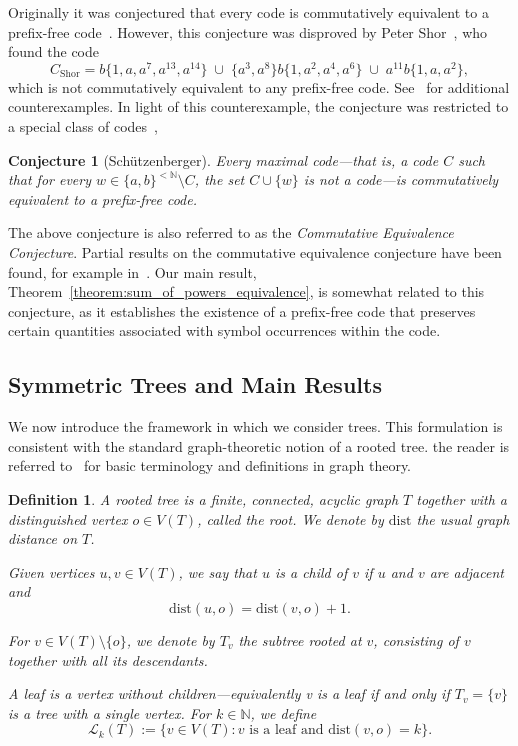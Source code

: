 \documentclass[a4,12pt]{article}%
\newtheorem{conjecture}[theorem]{Conjecture}
\newtheorem{definition}[theorem]{Definition}
\begin{document}
\medskip

Originally it was conjectured that every code is commutatively equivalent to a prefix-free code~\cite{CECoriginalConjecture}. However, this conjecture was disproved by Peter Shor~\cite{ShorCounterexample}, who found the code
\[
C_{\mathrm{Shor}} =
b\{1, a, a^7, a^{13}, a^{14} \}
\;\cup\;
\{a^3, a^8\}b\{1, a^2, a^4, a^6\}
\;\cup\;
a^{11}b\{1, a, a^2\},
\]
which is not commutatively equivalent to any prefix-free code. See~\cite{CompCounterexamples} for additional counterexamples. In light of this counterexample, the conjecture was restricted to a special class of codes~\cite{CECmaximalConjecture}, 

\begin{conjecture}[Sch\"{u}tzenberger]
Every \emph{maximal} code—that is, a code $C$ such that for every $w \in \{a,b\}^{<\mathbb{N}} \setminus C$, the set $C \cup \{w\}$ is not a code—is commutatively equivalent to a prefix-free code.
\end{conjecture}

The above conjecture is also referred to as the \emph{Commutative Equivalence Conjecture}. Partial results on the commutative
equivalence conjecture have been found, for example in~\cite{CECoriginalConjecture, PartialResult}. Our main result, Theorem~\ref{theorem:sum_of_powers_equivalence}, is somewhat related to this conjecture, as it establishes the existence of a prefix-free code that preserves certain quantities associated with symbol occurrences within the code. 

\subsection{Symmetric Trees and Main Results}

We now introduce the framework in which we consider trees. This formulation is consistent with the standard graph-theoretic notion of a rooted tree. the reader is referred to~\cite{GraphTheoryBasics} for basic terminology and definitions in graph theory. 

\begin{definition}
A \emph{rooted tree} is a finite, connected, acyclic graph $T$ together with a distinguished vertex $o \in V(T)$, called the \emph{root}. We denote by $\mathrm{dist}$ the usual graph distance on $T$.

Given vertices $u,v \in V(T)$, we say that $u$ is a \emph{child} of $v$ if $u$ and $v$ are adjacent and
\[
\mathrm{dist}(u,o) = \mathrm{dist}(v,o) + 1.
\]

For $v \in V(T) \setminus \{o\}$, we denote by $T_v$ the \emph{subtree rooted at $v$}, consisting of $v$ together with all its descendants.

A \emph{leaf} is a vertex without children---equivalently v is a leaf if and only if $T_v=\{v\}$ is a tree with a single vertex. For $k \in \mathbb{N}$, we define
\[
\mathcal{L}_k(T) := \{ v \in V(T) : v \text{ is a leaf and } \mathrm{dist}(v,o) = k \}.
\]
\end{definition}
\end{document}
